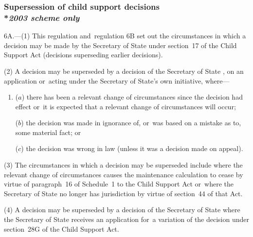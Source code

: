 \documentclass[12pt,a4paper]{article}
\begin{document}

\subsubsection[6A. Supersession of child support decisions]{Supersession of child support decisions\\*\emph{2003 scheme only}}

6A.---(1)  This regulation and~regulation 6B set out the circumstances in which a decision may be made by the 
Secretary of State  %
under section~17 of the Child Support Act (decisions superseding earlier decisions).

(2) A decision may be superseded by a decision of the 
Secretary of State%
, on an application or~acting under 
the Secretary of State's  %
own initiative, where—
\begin{enumerate}\item[]
($a$) there has been a relevant change of circumstances since the decision had effect or~it is expected that a relevant change of circumstances will occur;

($b$) the decision was made in ignorance of, or~was based on a mistake as to, some material fact; or

($c$) the decision was wrong in law (unless it was a decision made on appeal).
\end{enumerate}

(3) The circumstances in which a decision may be superseded include where the relevant change of circumstances causes the maintenance calculation to cease by virtue of paragraph~16 of Schedule~1 to the Child Support Act or~where the 
Secretary of State  %
no longer has jurisdiction by virtue of section~44 of that Act.

(4) A decision may be superseded by a decision of the 
Secretary of State  %
where the 
Secretary of State  %
receives an application for~a variation of the decision under section~28G of the Child Support Act.
\end{document}
